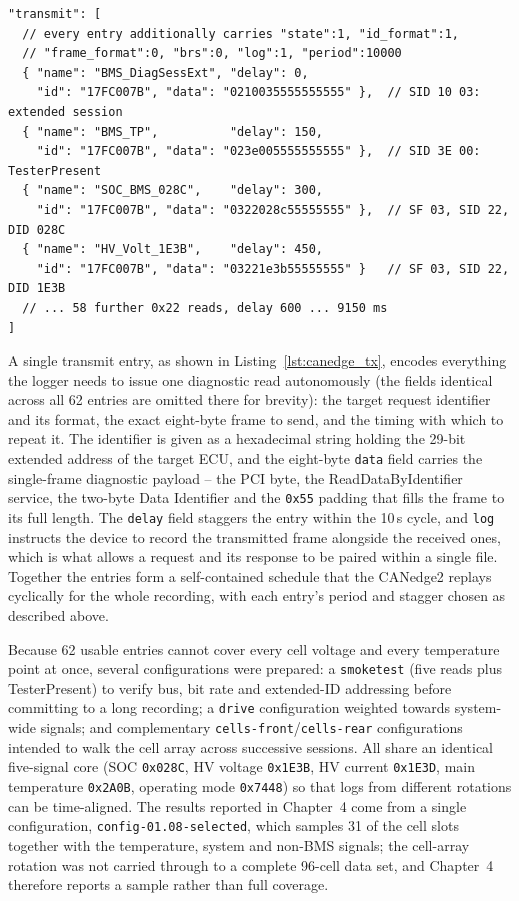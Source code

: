 \documentclass[11pt,a4paper,oneside,parskip=half]{scrreprt}
\providecommand{\hex}{}\renewcommand{\hex}[1]{\texttt{0x#1}}
\begin{document}
\begin{lstlisting}[float=htbp,caption={[Transmit-list entries]The first four entries of the 62-entry transmit list, from the deployed \texttt{config-01.08.json}. The fields common to every entry are factored into the comment for brevity.},label={lst:canedge_tx}]
"transmit": [
  // every entry additionally carries "state":1, "id_format":1,
  // "frame_format":0, "brs":0, "log":1, "period":10000
  { "name": "BMS_DiagSessExt", "delay": 0,
    "id": "17FC007B", "data": "0210035555555555" },  // SID 10 03: extended session
  { "name": "BMS_TP",          "delay": 150,
    "id": "17FC007B", "data": "023e005555555555" },  // SID 3E 00: TesterPresent
  { "name": "SOC_BMS_028C",    "delay": 300,
    "id": "17FC007B", "data": "0322028c55555555" },  // SF 03, SID 22, DID 028C
  { "name": "HV_Volt_1E3B",    "delay": 450,
    "id": "17FC007B", "data": "03221e3b55555555" }   // SF 03, SID 22, DID 1E3B
  // ... 58 further 0x22 reads, delay 600 ... 9150 ms
]
\end{lstlisting}

A single transmit entry, as shown in Listing~\ref{lst:canedge_tx}, encodes everything the logger needs to issue one diagnostic read autonomously (the fields identical across all 62 entries are omitted there for brevity): the target request identifier and its format, the exact eight-byte frame to send, and the timing with which to repeat it. The identifier is given as a hexadecimal string holding the 29-bit extended address of the target ECU, and the eight-byte \texttt{data} field carries the single-frame diagnostic payload -- the PCI byte, the ReadDataByIdentifier service, the two-byte Data Identifier and the \hex{55} padding that fills the frame to its full length. The \texttt{delay} field staggers the entry within the 10\,s cycle, and \texttt{log} instructs the device to record the transmitted frame alongside the received ones, which is what allows a request and its response to be paired within a single file. Together the entries form a self-contained schedule that the CANedge2 replays cyclically for the whole recording, with each entry's period and stagger chosen as described above.

Because 62 usable entries cannot cover every cell voltage and every temperature point at once, several configurations were prepared: a \texttt{smoketest} (five reads plus TesterPresent) to verify bus, bit rate and extended-ID addressing before committing to a long recording; a \texttt{drive} configuration weighted towards system-wide signals; and complementary \texttt{cells-front}/\texttt{cells-rear} configurations intended to walk the cell array across successive sessions. All share an identical five-signal core (SOC \hex{028C}, HV voltage \hex{1E3B}, HV current \hex{1E3D}, main temperature \hex{2A0B}, operating mode \hex{7448}) so that logs from different rotations can be time-aligned. The results reported in Chapter~4 come from a single configuration, \texttt{config-01.08-selected}, which samples 31 of the cell slots together with the temperature, system and non-BMS signals; the cell-array rotation was not carried through to a complete 96-cell data set, and Chapter~4 therefore reports a sample rather than full coverage.
\end{document}
